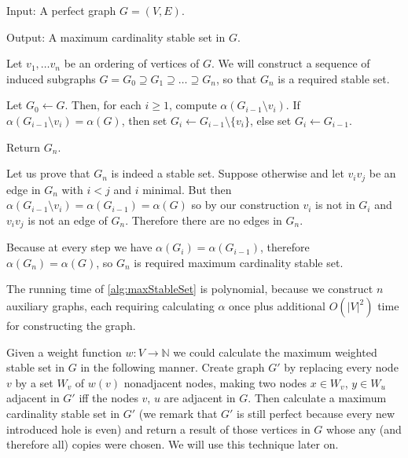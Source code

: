 \begin{alg}
  \label{alg:maxStableSet}
  Input: A perfect graph $G = (V, E)$.

  \noindent Output: A maximum cardinality stable set in $G$.
\end{alg}
\begin{algtext}
  Let $v_1, \ldots v_n$ be an ordering of vertices of $G$. We will construct a sequence of induced subgraphs $G = G_0 \supseteq G_1 \supseteq \ldots \supseteq G_n$, so that $G_n$ is a required stable set.

  Let $G_0 \leftarrow G$. Then, for each $i \geq 1$, compute $\alpha(G_{i-1} \setminus v_i)$. If $\alpha(G_{i-1} \setminus v_i) = \alpha(G)$, then set $G_i \leftarrow G_{i-1} \setminus \{v_i\}$, else set $G_i \leftarrow G_{i-1}$.

  Return $G_n$.
\end{algtext}

Let us prove that $G_n$ is indeed a stable set. Suppose otherwise and let $v_iv_j$ be an edge in $G_n$ with $i < j$ and $i$ minimal. But then $\alpha(G_{i-1} \setminus v_i) = \alpha(G_{i-1}) = \alpha(G)$ so by our construction $v_i$ is not in $G_i$ and $v_iv_j$ is not an edge of $G_n$. Therefore there are no edges in $G_n$.

Because at every step we have $\alpha(G_i) = \alpha(G_{i-1})$, therefore $\alpha(G_n) = \alpha(G)$, so $G_n$ is required maximum cardinality stable set.

The running time of \cref{alg:maxStableSet} is polynomial, because we construct $n$ auxiliary graphs, each requiring calculating $\alpha$ once plus additional $O(|V|^2)$ time for constructing the graph.

Given a weight function $w : V \rightarrow \mathbb{N}$ we could calculate the maximum weighted stable set in $G$ in the following manner. Create graph $G'$ by replacing every node $v$ by a set $W_v$ of $w(v)$ nonadjacent nodes, making two nodes $x \in W_v$, $y \in W_u$ adjacent in $G'$ iff the nodes $v$, $u$ are adjacent in $G$. Then calculate a maximum cardinality stable set in $G'$ (we remark that $G'$ is still perfect because every new introduced hole is even) and return a result of those vertices in $G$ whose any (and therefore all) copies were chosen. We will use this technique later on.

